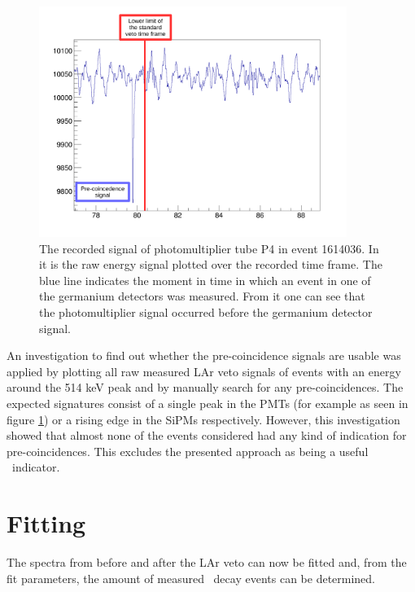 \documentclass[encoding=utf8,british]{tumphthesis}
\begin{document}
\begin{figure}[t!]
	\centering
	\ifmakefigures%
	\includegraphics[width=100mm]{./Bilder/BeispielSignal.pdf}
	\fi%

	\caption{
    The recorded signal of photomultiplier tube P4 in event 1614036. 
    In it is the raw energy signal plotted over the recorded time frame. 
    The blue line indicates the moment in time in which an event in one of the germanium detectors was measured. 
    From it one can see that the photomultiplier signal occurred before the germanium detector signal.   
    }
    	\label{fig:BeispielSignal}
    			\vspace{5mm}
\end{figure}


An investigation to find out whether the pre-coincidence signals are usable was applied by plotting all raw measured LAr veto signals of events with an energy around the 514 keV peak and by manually search for any pre-coincidences.
The expected signatures consist of a single peak in the PMTs (for example as seen in figure \ref{fig:BeispielSignal}) or a rising edge in the SiPMs respectively.
However, this investigation showed that almost none of the events considered had any kind of indication for pre-coincidences.
This excludes the presented approach as being a useful \Kr\ indicator.

\section{Fitting}
\label{sec:Fitting}

The spectra from before and after the LAr veto can now be fitted and, from the fit parameters, the amount of measured \Kr\ decay events can be determined.
\\
\end{document}
